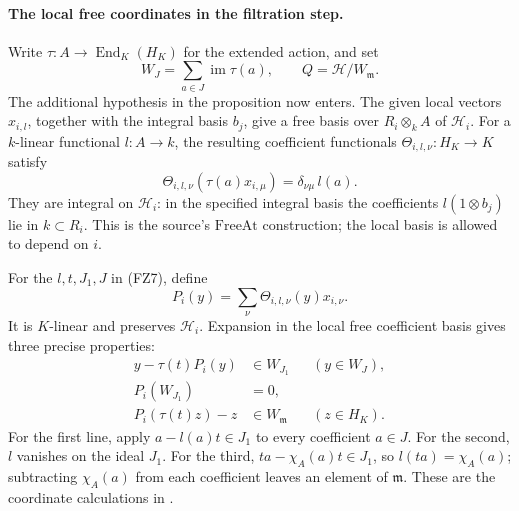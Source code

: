 \paragraph{The local free coordinates in the filtration step.}
Write \(\tau:A\to\operatorname{End}_K(H_K)\) for the
extended action, and set
\[
       W_J=\sum_{a\in J}\operatorname{im}\tau(a),\qquad
       Q=\mathcal H/W_{\mathfrak m}.
\]
The additional hypothesis in the proposition now enters.
The given local vectors \(x_{i,l}\), together with the
integral basis \(b_j\), give a free basis over
\(R_i\otimes_k A\) of \(\mathcal H_i\).
For a \(k\)-linear functional \(l:A\to k\), the resulting
coefficient functionals
\(\Theta_{i,l,\nu}:H_K\to K\) satisfy
\[
 \Theta_{i,l,\nu}(\tau(a)x_{i,\mu})
                               =\delta_{\nu\mu}\,l(a).
\]
They are integral on \(\mathcal H_i\):
in the specified integral basis the coefficients
\(l(1\otimes b_j)\) lie in \(k\subset R_i\).
This is the source's \(\mathrm{FreeAt}\) construction;
the local basis is allowed to depend on \(i\).

For the \(l,t,J_1,J\) in (FZ7), define
\[
                           P_i(y)=
                           \sum_\nu\Theta_{i,l,\nu}(y)x_{i,\nu}.
\]
It is \(K\)-linear and preserves \(\mathcal H_i\).
Expansion in the local free coefficient basis gives
three precise properties:
\[
 \begin{aligned}
 y-\tau(t)P_i(y)&\in W_{J_1} &&(y\in W_J),\\
                         P_i(W_{J_1})&=0,\\
 P_i(\tau(t)z)-z&\in W_{\mathfrak m} &&(z\in H_K).
 \end{aligned}
 \tag{FZ8}\label{eq:faithful-filtration-local-maps}
\]
For the first line, apply
\(a-l(a)t\in J_1\) to every coefficient \(a\in J\).
For the second, \(l\) vanishes on the ideal \(J_1\).
For the third,
\(ta-\chi_A(a)t\in J_1\), so
\(l(ta)=\chi_A(a)\); subtracting \(\chi_A(a)\)
from each coefficient leaves an element of
\(\mathfrak m\).
These are the coordinate calculations in
.

